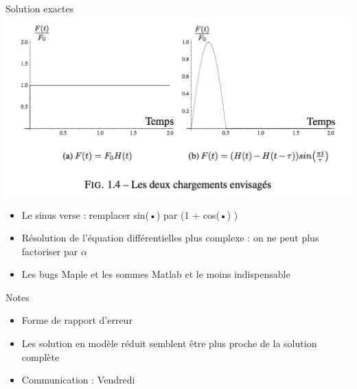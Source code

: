 \documentclass[10pt,a4paper]{beamer}
\begin{document}
\begin{frame}{Solution exactes}
	\includegraphics[width=0.8\linewidth]{Sinus.png}
	\begin{itemize}
		\item Le sinus verse : remplacer sin(•) par (1 + cos(•) )
		\item Résolution de l'équation différentielles plus complexe : on ne peut plus factoriser par $\alpha$
		\item Les bugs Maple et les sommes Matlab et le moins indispensable
	\end{itemize}
\end{frame}

\begin{frame}{Notes}
	\begin{itemize}
		\item Forme de rapport d’erreur
		\item Les solution en modèle réduit semblent être plus proche de la solution complète 
		\item Communication : Vendredi
	\end{itemize}
\end{frame}
\end{document}
